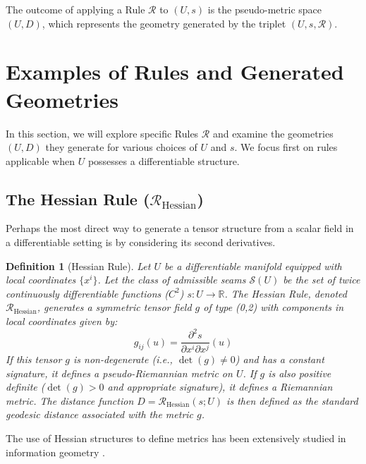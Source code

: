 \documentclass[twoside,twocolumn]{article}
\newtheorem{definition}{Definition}[subsection] %
\begin{document}
The outcome of applying a Rule $\mathcal{R}$ to $(U, s)$ is the pseudo-metric space $(U, D)$, which represents the geometry generated by the triplet $(U, s, \mathcal{R})$.


\setcounter{equation}{0}
\section{Examples of Rules and Generated Geometries}

In this section, we will explore specific Rules $\mathcal{R}$ and examine the geometries $(U, D)$ they generate for various choices of $U$ and $s$. We focus first on rules applicable when $U$ possesses a differentiable structure.

\subsection{The Hessian Rule ($\mathcal{R}_{\text{Hessian}}$)}
\setcounter{definition}{0}

Perhaps the most direct way to generate a tensor structure from a scalar field in a differentiable setting is by considering its second derivatives.

\begin{definition}[Hessian Rule]
Let $U$ be a differentiable manifold equipped with local coordinates $\{x^i\}$. Let the class of admissible seams $\mathcal{S}(U)$ be the set of twice continuously differentiable functions ($C^2$) $s: U \to \mathbb{R}$. The \emph{Hessian Rule}, denoted $\mathcal{R}_{\text{Hessian}}$, generates a symmetric tensor field $g$ of type (0,2) with components in local coordinates given by:
\begin{equation}
g_{ij}(u) = \frac{\partial^2 s}{\partial x^i \partial x^j}(u)
\label{eq:hessian_rule}
\end{equation}
If this tensor $g$ is non-degenerate (i.e., $\det(g) \neq 0$) and has a constant signature, it defines a pseudo-Riemannian metric on $U$. If $g$ is also positive definite ($\det(g) > 0$ and appropriate signature), it defines a Riemannian metric. The distance function $D = \mathcal{R}_{\text{Hessian}}(s; U)$ is then defined as the standard geodesic distance associated with the metric $g$.
\end{definition}
The use of Hessian structures to define metrics has been extensively studied in information geometry \cite{Amari2016,Shima2007}.
\end{document}
